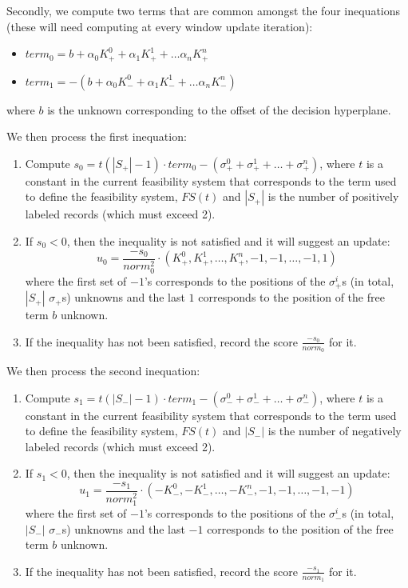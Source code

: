 \documentclass[a4paper,twoside,10pt]{report}
\begin{document}
	Secondly, we compute two terms that are common amongst the four inequations (these will need computing at every window update iteration):			
	\begin{itemize}
		\item \(term_0 = b + \alpha_0 K_+^0 + \alpha_1 K_+^1 + \ldots \alpha_n K_+^n\)
		\item \(term_1 = -(b + \alpha_0 K_-^0 + \alpha_1 K_-^1 + \ldots \alpha_n K_-^n)\)
	\end{itemize}	
	where \(b\) is the unknown corresponding to the offset of the decision hyperplane.
	
	
	We then process the first inequation:
	
	\begin{enumerate}
		\item Compute \(s_0 = t (|S_+| - 1)\cdot term_0 - (\sigma_+^0 + \sigma_+^1 + \ldots + \sigma_+^n)\), where \(t\) is a constant in the current feasibility system that corresponds to the term used to define the feasibility system, \(FS(t)\) and \(|S_+|\) is the number of positively labeled records (which must exceed 2).
		\item If \(s_0 < 0\), then the inequality is not satisfied and it will suggest an update:
		\[
			u_0 = \frac{-s_0}{norm_0^2}\cdot(K_+^0, K_+^1, \ldots, K_+^n, -1, -1, \ldots, -1, 1)
		\]		
		where the first set of \(-1\)'s corresponds to the positions of the \(\sigma_+^i\)s (in total, \(|S_+|\) \(\sigma_+\)s) unknowns and the last \(1\) corresponds to the position of the free term \(b\) unknown.
		\item If the inequality has not been satisfied, record the score \(\frac{-s_0}{norm_0}\) for it.
	\end{enumerate}
	
	
	
	We then process the second inequation:
	
	\begin{enumerate}
		\item Compute \(s_1 = t (|S_-| - 1)\cdot term_1 - (\sigma_-^0 + \sigma_-^1 + \ldots + \sigma_-^n)\), where \(t\) is a constant in the current feasibility system that corresponds to the term used to define the feasibility system, \(FS(t)\) and \(|S_-|\) is the number of negatively labeled records (which must exceed 2).
		\item If \(s_1 < 0\), then the inequality is not satisfied and it will suggest an update:
		\[
			u_1 = \frac{-s_1}{norm_1^2}\cdot(-K_-^0, -K_-^1, \ldots, -K_-^n, -1, -1, \ldots, -1, -1)
		\]		
		where the first set of \(-1\)'s corresponds to the positions of the \(\sigma_-^i\)s (in total, \(|S_-|\) \(\sigma_-\)s) unknowns and the last \(-1\) corresponds to the position of the free term \(b\) unknown.
		\item If the inequality has not been satisfied, record the score \(\frac{-s_1}{norm_1}\) for it.
	\end{enumerate}
		
\end{document}
